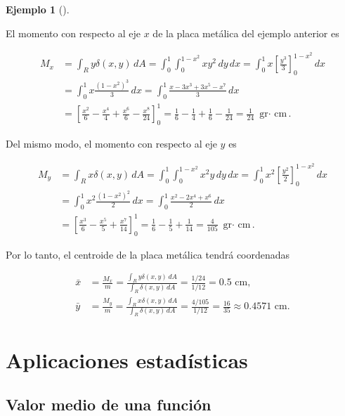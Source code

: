 \documentclass[
  a4paper,
]{scrreport}
\theoremstyle{plain}
\theoremstyle{definition}
\theoremstyle{plain}
\theoremstyle{plain}
\theoremstyle{definition}
\newtheorem{example}{Ejemplo}[chapter]
\theoremstyle{definition}
\theoremstyle{remark}
\begin{document}
\begin{example}[]\protect\hypertarget{exm-centro-masas-solido-plano-densidad-variable}{}\label{exm-centro-masas-solido-plano-densidad-variable}

El momento con respecto al eje \(x\) de la placa metálica del ejemplo
anterior es

\begin{align*}
M_x
&= \int_R y\delta(x,y)\,dA
= \int_0^1 \int_0^{1-x^2} xy^2\,dy\,dx
= \int_0^1 x\left[\frac{y^3}{3}\right]_0^{1-x^2}\,dx \\
&= \int_0^1 x\frac{(1-x^2)^3}{3}\,dx 
= \int_0^1 \frac{x-3x^3+3x^5-x^7}{3}\,dx \\
&= \left[\frac{x^2}{6}-\frac{x^4}{4}+\frac{x^6}{6}-\frac{x^8}{24}\right]_0^1
= \frac{1}{6}-\frac{1}{4}+\frac{1}{6}-\frac{1}{24}
= \frac{1}{24} \mbox{ gr$\cdot$ cm}.
\end{align*}

Del mismo modo, el momento con respecto al eje \(y\) es

\begin{align*}
M_y
&= \int_R x\delta(x,y)\,dA
= \int_0^1 \int_0^{1-x^2} x^2y\,dy\,dx
= \int_0^1 x^2\left[\frac{y^2}{2}\right]_0^{1-x^2}\,dx \\
&= \int_0^1 x^2\frac{(1-x^2)^2}{2}\,dx 
= \int_0^1 \frac{x^2-2x^4+x^6}{2}\,dx \\
&= \left[\frac{x^3}{6}-\frac{x^5}{5}+\frac{x^7}{14}\right]_0^1
= \frac{1}{6}-\frac{1}{5}+\frac{1}{14}
= \frac{4}{105} \mbox{ gr$\cdot$ cm}.
\end{align*}

Por lo tanto, el centroide de la placa metálica tendrá coordenadas

\begin{align*}
\bar x 
&= \frac{M_x}{m}
= \frac{\int_R y\delta(x,y)\,dA}{\int_R \delta(x,y)\,dA} 
= \frac{1/24}{1/12} = 0.5 \mbox{ cm},\\
\bar y
&= \frac{M_y}{m}
= \frac{\int_R x\delta(x,y)\,dA}{\int_R \delta(x,y)\,dA}
= \frac{4/105}{1/12} = \frac{16}{35} \approx 0.4571  \mbox{ cm}.
\end{align*}

\end{example}

\section{Aplicaciones
estadísticas}\label{aplicaciones-estaduxedsticas-1}

\subsection{Valor medio de una
función}\label{valor-medio-de-una-funciuxf3n}
\end{document}
